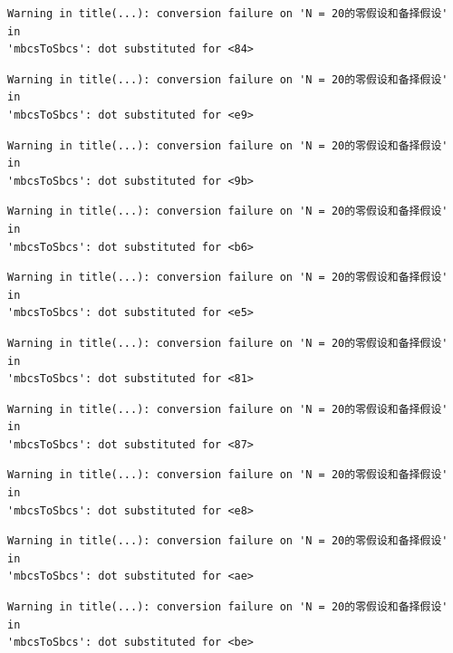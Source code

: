 \documentclass[
  letterpaper,
  DIV=11,
  numbers=noendperiod]{scrreprt}
\begin{document}
\begin{verbatim}
Warning in title(...): conversion failure on 'N = 20的零假设和备择假设' in
'mbcsToSbcs': dot substituted for <84>
\end{verbatim}

\begin{verbatim}
Warning in title(...): conversion failure on 'N = 20的零假设和备择假设' in
'mbcsToSbcs': dot substituted for <e9>
\end{verbatim}

\begin{verbatim}
Warning in title(...): conversion failure on 'N = 20的零假设和备择假设' in
'mbcsToSbcs': dot substituted for <9b>
\end{verbatim}

\begin{verbatim}
Warning in title(...): conversion failure on 'N = 20的零假设和备择假设' in
'mbcsToSbcs': dot substituted for <b6>
\end{verbatim}

\begin{verbatim}
Warning in title(...): conversion failure on 'N = 20的零假设和备择假设' in
'mbcsToSbcs': dot substituted for <e5>
\end{verbatim}

\begin{verbatim}
Warning in title(...): conversion failure on 'N = 20的零假设和备择假设' in
'mbcsToSbcs': dot substituted for <81>
\end{verbatim}

\begin{verbatim}
Warning in title(...): conversion failure on 'N = 20的零假设和备择假设' in
'mbcsToSbcs': dot substituted for <87>
\end{verbatim}

\begin{verbatim}
Warning in title(...): conversion failure on 'N = 20的零假设和备择假设' in
'mbcsToSbcs': dot substituted for <e8>
\end{verbatim}

\begin{verbatim}
Warning in title(...): conversion failure on 'N = 20的零假设和备择假设' in
'mbcsToSbcs': dot substituted for <ae>
\end{verbatim}

\begin{verbatim}
Warning in title(...): conversion failure on 'N = 20的零假设和备择假设' in
'mbcsToSbcs': dot substituted for <be>
\end{verbatim}
\end{document}
